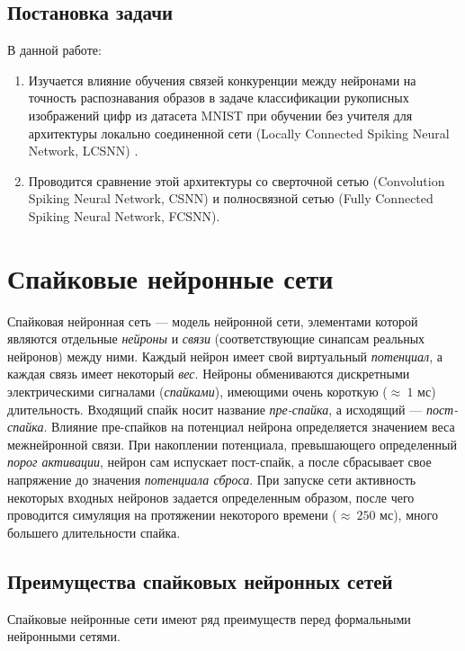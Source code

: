 \documentclass[a4paper]{article}
\begin{document}
\subsection*{Постановка задачи}
В данной работе:

\begin{enumerate}
\item Изучается влияние обучения связей конкуренции \cite{MaxActiv1, MaxActiv2, hardware_survey} между нейронами на точность распознавания образов в задаче классификации рукописных изображений цифр из датасета MNIST \cite{MNIST} при обучении без учителя для архитектуры локально соединенной сети (Locally Connected Spiking Neural Network, LCSNN) \cite{saunders2019locally}.

\item Проводится сравнение этой архитектуры со сверточной сетью (Convolution Spiking Neural Network, CSNN) и полносвязной сетью (Fully Connected Spiking Neural Network, FCSNN).

\end{enumerate}

\clearpage 

\section{Спайковые нейронные сети}
Спайковая нейронная сеть --- модель нейронной сети, элементами которой являются  отдельные \textit{нейроны} и \textit{связи} (соответствующие синапсам реальных нейронов) между ними. Каждый нейрон имеет свой виртуальный \textit{потенциал}, а каждая связь имеет некоторый \textit{вес}. Нейроны обмениваются дискретными электрическими сигналами (\textit{спайками}), имеющими очень короткую ($ \approx ~1$ мс) длительность. Входящий спайк носит название \textit{пре-спайка}, а исходящий --- \textit{пост-спайка}.  Влияние пре-спайков на потенциал нейрона определяется значением веса межнейронной связи. При накоплении потенциала, превышающего определенный \textit{порог активации}, нейрон сам испускает пост-спайк, а после сбрасывает свое напряжение до значения \textit{потенциала сброса}. При запуске сети активность некоторых входных нейронов задается определенным образом, после чего проводится симуляция на протяжении некоторого времени ($\approx ~250$ мс), много большего длительности спайка.

\subsection{Преимущества спайковых нейронных сетей}
Спайковые нейронные сети имеют ряд преимуществ перед формальными нейронными сетями.
\end{document}
